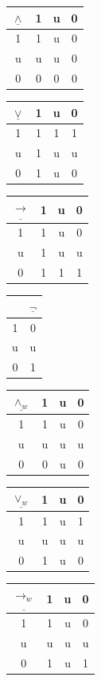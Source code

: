 \documentclass[11pt,a4paper,titlepage]{article}
\theoremstyle{definition}
\newcommand{\3}{\vspace{.3in}}
\newcommand{\2}{\vspace{.2in}}
\newcommand{\1}{\vspace{.1in}}
\newcommand{\5}{\vspace{.05in}}
\begin{document}
\begin{center}
	\begin{tabular}{|c|ccc|}
		\hline
		$\underline{\wedge} $ & 1 & u & 0 \\
		\hline
		1 & 1 & u & 0 \\
		u & u & u & 0 \\
		0 & 0 & 0 & 0 \\
		\hline
	\end{tabular}
	\begin{tabular}{|c|ccc|}
		\hline$\underline{\vee} $ & 1 & u & 0 \\\hline
		1 & 1 & 1 & 1 \\
		u & 1 & u & u \\
		0 & 1 & u & 0 \\\hline
	\end{tabular}
	\begin{tabular}{|c|ccc|}
		\hline
		$\underline{\rightarrow} $ & 1 & u & 0 \\
		\hline
		1 & 1 & u & 0 \\
		u & 1 & u & u \\
		0 & 1 & 1 & 1 \\
		\hline
	\end{tabular}
	\begin{tabular}{|c|c|}
		\hline  & $\underline{\neg} $\\\hline
		1 & 0\\
		u & u \\
		0 & 1 \\\hline
	\end{tabular}
\end{center} 
\begin{center} 	
\begin{tabular}{|c|ccc|}
	\hline
	$\underline{\wedge_w} $ & 1 & u & 0 \\
	\hline
	1 & 1 & u & 0 \\
	u & u & u & u \\
	0 & 0 & u & 0 \\
	\hline
\end{tabular}
\begin{tabular}{|c|ccc|}
	\hline$\underline{\vee_w} $ & 1 & u & 0 \\\hline
	1 & 1 & u & 1 \\
	u & u & u & u \\
	0 & 1 & u & 0 \\\hline
\end{tabular}
\begin{tabular}{|c|ccc|}
	\hline
	$\underline{\rightarrow_w} $ & 1 & u & 0 \\
	\hline
	1 & 1 & u & 0 \\
	u & u & u & u \\
	0 & 1 & u & 1 \\
	\hline
\end{tabular}
\end{center} 
\end{document}
